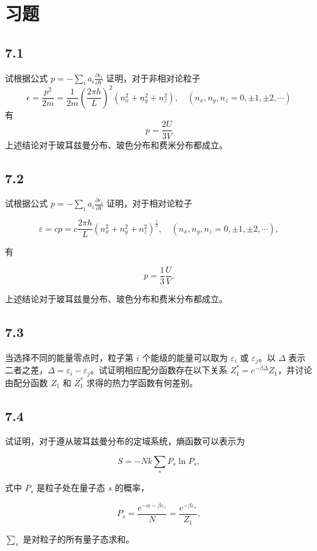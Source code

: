 \section{习题}

\newpage
\subsection{7.1}
试根据公式 $p = -\sum_i a_i \frac{\partial \epsilon_i}{\partial V}$ 证明，对于非相对论粒子
$$\epsilon = \frac{p^2}{2m} = \frac{1}{2m} \left( \frac{2\pi h}{L} \right)^2 \left( n_x^2 + n_y^2 + n_z^2 \right), \quad (n_x, n_y, n_z = 0, \pm 1, \pm 2, \cdots)$$
有
$$p = \frac{2U}{3V}$$
上述结论对于玻耳兹曼分布、玻色分布和费米分布都成立。

\newpage
\subsection{7.2}
试根据公式 $ p = -\sum_i a_i \frac{\partial \varepsilon_i}{\partial V} $ 证明，对于相对论粒子

$$\varepsilon = cp = c \frac{2\pi\hbar}{L} \left( n_x^2 + n_y^2 + n_z^2 \right)^{\frac{1}{2}}, \quad (n_x, n_y, n_z = 0, \pm 1, \pm 2, \cdots),$$

有

$$p = \frac{1}{3} \frac{U}{V}.$$

上述结论对于玻耳兹曼分布、玻色分布和费米分布都成立。

\newpage
\subsection{7.3}
当选择不同的能量零点时，粒子第 $ i $ 个能级的能量可以取为 $ \varepsilon_i $ 或 $ \varepsilon_j $。以 $\Delta$ 表示二者之差，$\Delta = \varepsilon_i - \varepsilon_j$。试证明相应配分函数存在以下关系 $ Z_1^* = e^{-\beta\Delta}Z_1 $，并讨论由配分函数 $ Z_1 $ 和 $ Z_1^* $ 求得的热力学函数有何差别。

\newpage
\subsection{7.4}
试证明，对于遵从玻耳兹曼分布的定域系统，熵函数可以表示为

$$S = -Nk \sum_s P_s \ln P_s,$$

式中 $ P_s $ 是粒子处在量子态 $ s $ 的概率，

$$P_s = \frac{e^{-\alpha - \beta \varepsilon_s}}{N} = \frac{e^{-\beta \varepsilon_s}}{Z_1},$$

$\sum_s$ 是对粒子的所有量子态求和。

